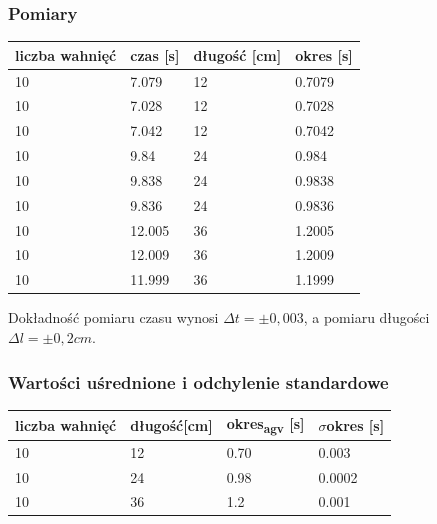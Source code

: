 \documentclass[a4paper, 11pt]{article}
\begin{document}
\subsubsection{Pomiary}
\begin{center}
	\begin{tabular}{|l|l|l|l|}
		\hline
		liczba wahnięć & czas [s] & długość [cm] & okres [s] \\ \hline
		10             & 7.079    & 12           & 0.7079    \\ \hline
		10             & 7.028    & 12           & 0.7028    \\ \hline
		10             & 7.042    & 12           & 0.7042    \\ \hline
		10             & 9.84     & 24           & 0.984     \\ \hline
		10             & 9.838    & 24           & 0.9838    \\ \hline
		10             & 9.836    & 24           & 0.9836    \\ \hline
		10             & 12.005   & 36           & 1.2005    \\ \hline
		10             & 12.009   & 36           & 1.2009    \\ \hline
		10             & 11.999   & 36           & 1.1999    \\ \hline
	\end{tabular}

\end{center}
Dokładność pomiaru czasu wynosi $\Delta t = \pm0,003$, a pomiaru długości $\Delta l = \pm0,2cm$.

\subsubsection{Wartości uśrednione i odchylenie standardowe}
\begin{center}
	\begin{tabular}{|l|l|l|l|}
		\hline
		liczba wahnięć & długość[cm] & okres\textsubscript{agv} [s] & $\sigma$okres [s] \\ \hline
		10             & 12          & 0.70                         & 0.003             \\ \hline
		10             & 24          & 0.98                         & 0.0002            \\ \hline
		10             & 36          & 1.2                          & 0.001             \\ \hline
	\end{tabular}
\end{center}
\end{document}
